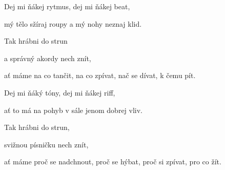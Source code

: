 

\zs
Dej mi ňákej rytmus, dej mi ňákej beat,

mý tělo sžíraj roupy a mý nohy neznaj klid.

Tak hrábni do strun

a správný akordy nech znít,

ať máme na co tančit, na co zpívat, nač se dívat, k čemu pít.
\ks

\zs
Dej mi ňáký tóny, dej mi ňákej riff,

ať to má na pohyb v sále jenom dobrej vliv.

Tak hrábni do strun,

svižnou písničku nech znít,

ať máme proč se nadchnout, proč se hýbat, proč si zpívat, pro co žít.
\ks

\kp
